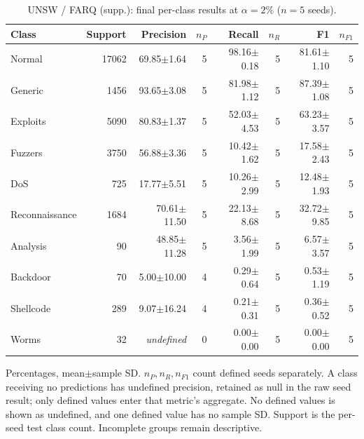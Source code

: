 \begin{table}[t]
\centering\scriptsize
\setlength{\tabcolsep}{3.3pt}
\caption{UNSW / FARQ (supp.): final per-class results at $\alpha=2\%$ ($n=5$ seeds).}\label{tab:forgetting-class-unsw_nb15-farq}
\begin{tabular}{lrrrrrrr}
\toprule
Class & Support & Precision & $n_P$ & Recall & $n_R$ & F1 & $n_{F1}$ \\
\midrule
Normal & 17062 & 69.85$\pm$1.64 & 5 & 98.16$\pm$0.18 & 5 & 81.61$\pm$1.10 & 5 \\
Generic & 1456 & 93.65$\pm$3.08 & 5 & 81.98$\pm$1.12 & 5 & 87.39$\pm$1.08 & 5 \\
Exploits & 5090 & 80.83$\pm$1.37 & 5 & 52.03$\pm$4.53 & 5 & 63.23$\pm$3.57 & 5 \\
Fuzzers & 3750 & 56.88$\pm$3.36 & 5 & 10.42$\pm$1.62 & 5 & 17.58$\pm$2.43 & 5 \\
DoS & 725 & 17.77$\pm$5.51 & 5 & 10.26$\pm$2.99 & 5 & 12.48$\pm$1.93 & 5 \\
Reconnaissance & 1684 & 70.61$\pm$11.50 & 5 & 22.13$\pm$8.68 & 5 & 32.72$\pm$9.85 & 5 \\
Analysis & 90 & 48.85$\pm$11.28 & 5 & 3.56$\pm$1.99 & 5 & 6.57$\pm$3.57 & 5 \\
Backdoor & 70 & 5.00$\pm$10.00 & 4 & 0.29$\pm$0.64 & 5 & 0.53$\pm$1.19 & 5 \\
Shellcode & 289 & 9.07$\pm$16.24 & 4 & 0.21$\pm$0.31 & 5 & 0.36$\pm$0.52 & 5 \\
Worms & 32 & \textit{undefined} & 0 & 0.00$\pm$0.00 & 5 & 0.00$\pm$0.00 & 5 \\
\bottomrule
\end{tabular}
\par\smallskip\begin{minipage}{0.98\textwidth}\scriptsize Percentages, mean$\pm$sample SD. $n_P,n_R,n_{F1}$ count defined seeds separately. A class receiving no predictions has undefined precision, retained as null in the raw seed result; only defined values enter that metric's aggregate. No defined values is shown as undefined, and one defined value has no sample SD. Support is the per-seed test class count. Incomplete groups remain descriptive.\end{minipage}
\end{table}

